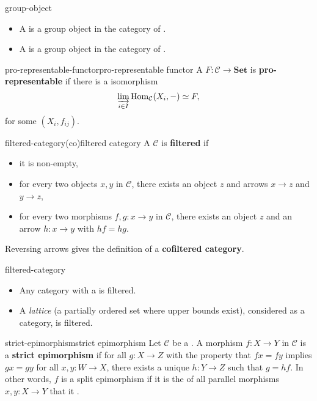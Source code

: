 \begin{example}{group-object}
    \begin{itemize}
        \item A  is a group object in the category of .
        \item A  is a group object in the category of .
    \end{itemize}
\end{example}

\begin{topic}{pro-representable-functor}{pro-representable functor}
    A  $F : \mathcal{C} \to \textbf{Set}$ is \textbf{pro-representable} if there is a  isomorphism
    \[ \varinjlim_{i \in I} \operatorname{Hom}_\mathcal{C}(X_i, -) \simeq F , \]
    for some  $(X_i, f_{ij})$.
\end{topic}

\begin{topic}{filtered-category}{(co)filtered category}
    A  $\mathcal{C}$ is \textbf{filtered} if
    \begin{itemize}
        \item it is non-empty,
        \item for every two objects $x, y$ in $\mathcal{C}$, there exists an object $z$ and arrows $x \to z$ and $y \to z$,
        \item for every two morphisms $f, g : x \to y$ in $\mathcal{C}$, there exists an object $z$ and an arrow $h : x \to y$ with $hf = hg$.
    \end{itemize}
    Reversing arrows gives the definition of a \textbf{cofiltered category}.
\end{topic}

\begin{example}{filtered-category}
    \begin{itemize}
        \item Any category with a  is filtered.
        \item A \textit{lattice} (a partially ordered set where upper bounds exist), considered as a category, is filtered.
    \end{itemize}
\end{example}

\begin{topic}{strict-epimorphism}{strict epimorphism}
    Let $\mathcal{C}$ be a . A morphism $f : X \to Y$ in $\mathcal{C}$ is a \textbf{strict epimorphism} if for all $g : X \to Z$ with the property that $fx = fy$ implies $gx = gy$ for all $x, y : W \to X$, there exists a unique $h : Y \to Z$ such that $g = hf$. In other words, $f$ is a split epimorphism if it is the  of all parallel morphisms $x, y : X \to Y$ that it .
\end{topic}

